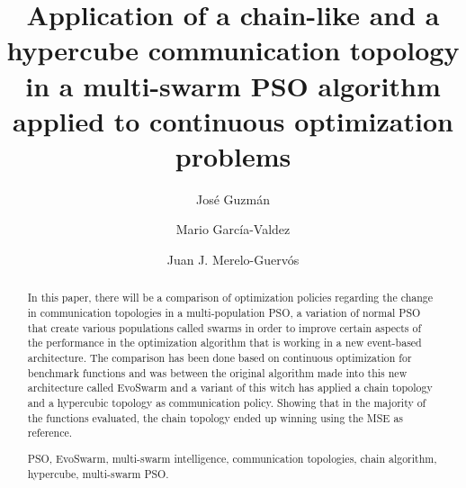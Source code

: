 \documentclass[runningheads]{llncs}
\newcommand{\keywords}[1]{\par\addvspace\baselineskip
\noindent\keywordname\enspace\ignorespaces#1}
\begin{document}
\mainmatter  %

\title{Application of a chain-like and a hypercube communication topology 
in a multi-swarm PSO algorithm applied to continuous optimization problems}


%
%
\author{José Guzmán \and Mario García-Valdez \and Juan J. Merelo-Guervós}





%
%

\toctitle{}

\maketitle


\begin{abstract}

In this paper, there will be a comparison of optimization policies regarding the
change in communication topologies in a multi-population PSO, a
variation of normal PSO that create various populations called swarms
in order to improve certain aspects of the performance in the
optimization algorithm that is working in a new event-based
architecture. The comparison has been done based on continuous
optimization for benchmark functions and was between the original
algorithm made into this new architecture called EvoSwarm and a
variant of this witch has applied a chain topology and a hypercubic
topology as communication policy. Showing that in the majority of the
functions evaluated, the chain topology  ended up winning using the
MSE as reference. %

\keywords{PSO, EvoSwarm, multi-swarm intelligence, communication topologies,
 chain algorithm, hypercube, multi-swarm PSO.}
\end{abstract}
\end{document}
